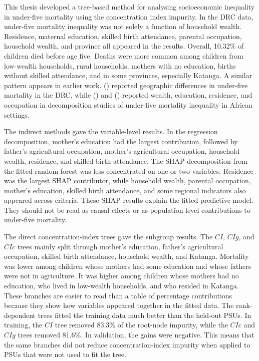 \documentclass[
  11pt,
  a4paper,
]{article}
\begin{document}
This thesis developed a tree-based method for analysing socioeconomic
inequality in under-five mortality using the concentration index
impurity. In the DRC data, under-five mortality inequality was not
solely a function of household wealth. Residence, maternal education,
skilled birth attendance, parental occupation, household wealth, and
province all appeared in the results. Overall, 10.32\% of children died
before age five. Deaths were more common among children from low-wealth
households, rural households, mothers with no education, births without
skilled attendance, and in some provinces, especially Katanga. A similar
pattern appears in earlier work. () reported geographic differences in under-five
mortality in the DRC, while () and
() reported wealth, education, residence, and occupation in
decomposition studies of under-five mortality inequality in African
settings.

The indirect methods gave the variable-level results. In the regression
decomposition, mother's education had the largest contribution, followed
by father's agricultural occupation, mother's agricultural occupation,
household wealth, residence, and skilled birth attendance. The SHAP
decomposition from the fitted random forest was less concentrated on one
or two variables. Residence was the largest SHAP contributor, while
household wealth, parental occupation, mother's education, skilled birth
attendance, and some regional indicators also appeared across criteria.
These SHAP results explain the fitted predictive model. They should not
be read as causal effects or as population-level contributions to
under-five mortality.

The direct concentration-index trees gave the subgroup results. The
\(CI\), \(CIg\), and \(CIc\) trees mainly split through mother's
education, father's agricultural occupation, skilled birth attendance,
household wealth, and Katanga. Mortality was lower among children whose
mothers had some education and whose fathers were not in agriculture. It
was higher among children whose mothers had no education, who lived in
low-wealth households, and who resided in Katanga. These branches are
easier to read than a table of percentage contributions because they
show how variables appeared together in the fitted data. The
rank-dependent trees fitted the training data much better than the
held-out PSUs. In training, the \(CI\) tree removed 83.3\% of the
root-node impurity, while the \(CIc\) and \(CIg\) trees removed 81.6\%.
In validation, the gains were negative. This means that the same
branches did not reduce concentration-index impurity when applied to
PSUs that were not used to fit the tree.
\end{document}
